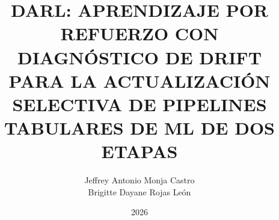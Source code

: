 \documentclass[a4paper,12pt,oneside]{tesisutec}
\begin{document}
\frontmatter


\title{\MakeUppercase{DARL: Aprendizaje por Refuerzo con Diagnóstico de Drift para la Actualización Selectiva de Pipelines Tabulares de ML de Dos Etapas}}

\author{Jeffrey Antonio Monja Castro \texorpdfstring{\\}{, }Brigitte Dayane Rojas León } %

\date{2026}

\maketitle






\tableofcontents

\newpage

\listoftables

\newpage

\listoffigures


\mainmatter
\pagestyle{fancy}











\renewcommand{\bibname}{\vspace{-3cm}\hfill\Large\bf{REFERENCIAS BIBLIOGRÁFICAS}\hfill}




\end{document}
